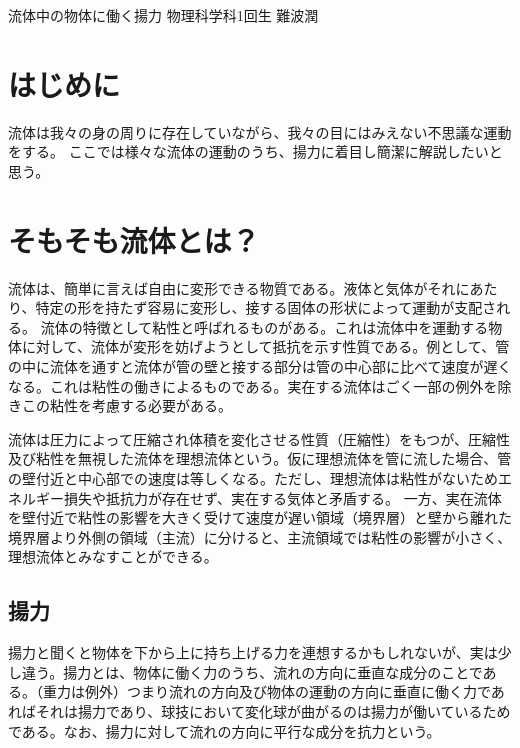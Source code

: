 \documentclass[10pt,b5paper,papersize,dvipdfmx]{jsbook}
\begin{document}

\kaishititle%
  {流体中の物体に働く揚力}%
  {物理科学科1回生}%
  {難波潤}%


%
\section*{はじめに}
流体は我々の身の周りに存在していながら、我々の目にはみえない不思議な運動をする。
ここでは様々な流体の運動のうち、揚力に着目し簡潔に解説したいと思う。
\par
\section{そもそも流体とは？}
流体は、簡単に言えば自由に変形できる物質である。液体と気体がそれにあたり、特定の形を持たず容易に変形し、接する固体の形状によって運動が支配される。
流体の特徴として粘性と呼ばれるものがある。これは流体中を運動する物体に対して、流体が変形を妨げようとして抵抗を示す性質である。例として、管の中に流体を通すと流体が管の壁と接する部分は管の中心部に比べて速度が遅くなる。これは粘性の働きによるものである。実在する流体はごく一部の例外を除きこの粘性を考慮する必要がある。
\par
流体は圧力によって圧縮され体積を変化させる性質（圧縮性）をもつが、圧縮性及び粘性を無視した流体を理想流体という。仮に理想流体を管に流した場合、管の壁付近と中心部での速度は等しくなる。ただし、理想流体は粘性がないためエネルギー損失や抵抗力が存在せず、実在する気体と矛盾する。
一方、実在流体を壁付近で粘性の影響を大きく受けて速度が遅い領域（境界層）と壁から離れた境界層より外側の領域（主流）に分けると、主流領域では粘性の影響が小さく、理想流体とみなすことができる。
\par
\subsection{揚力}
揚力と聞くと物体を下から上に持ち上げる力を連想するかもしれないが、実は少し違う。揚力とは、物体に働く力のうち、流れの方向に垂直な成分のことである。（重力は例外）つまり流れの方向及び物体の運動の方向に垂直に働く力であればそれは揚力であり、球技において変化球が曲がるのは揚力が働いているためである。なお、揚力に対して流れの方向に平行な成分を抗力という。
\par
\end{document}
